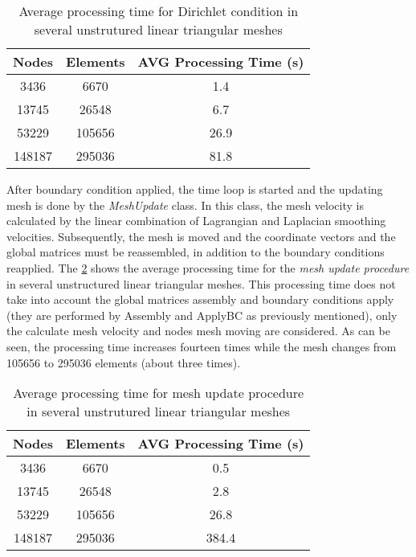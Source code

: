 \vspace{0.5cm}
\begin{table}[H]
\caption{Average processing time for Dirichlet condition in several unstrutured linear triangular meshes}
\centering
\begin{tabular}{ccc}
\toprule
\textbf{Nodes} & \textbf{Elements} & \textbf{AVG Processing Time} (s) \\
\midrule
3436 & 6670 & 1.4 \\
13745 & 26548 & 6.7 \\
53229 & 105656 & 26.9 \\
148187 & 295036 & 81.8 \\



\bottomrule
\end{tabular}
\label{tempo contorno}
\end{table}
 
\medskip
After boundary condition applied, the time loop is started and
the updating mesh is done by the \textit{MeshUpdate} class.
In this class, the mesh velocity is calculated by the
linear combination of Lagrangian and Laplacian smoothing velocities.
Subsequently, the mesh is moved and 
the coordinate vectors and the global matrices
must be reassembled, in addition to the boundary conditions reapplied.
The \ref{tempo mesh update} 
shows the average processing time for the \textit{mesh update procedure}
in several unstructured linear triangular meshes.
This processing time does not take into account the global matrices assembly and
boundary conditions apply (they are performed by Assembly and ApplyBC
 as previously mentioned), 
only the calculate mesh velocity and nodes mesh moving
are considered. 
As can be seen, the processing time increases fourteen times 
while the mesh changes from 105656 to 295036 elements 
(about three times). 

\vspace{0.5cm}
\begin{table}[H]
\caption{Average processing time for mesh update procedure in several unstrutured linear triangular meshes}
\centering
\begin{tabular}{ccc}
\toprule
\textbf{Nodes} & \textbf{Elements} & \textbf{AVG Processing Time} (s) \\
\midrule
3436 & 6670 & 0.5 \\
13745 & 26548 & 2.8 \\
53229 & 105656 & 26.8 \\
148187 & 295036 & 384.4 \\



\bottomrule
\end{tabular}
\label{tempo mesh update}
\end{table}

